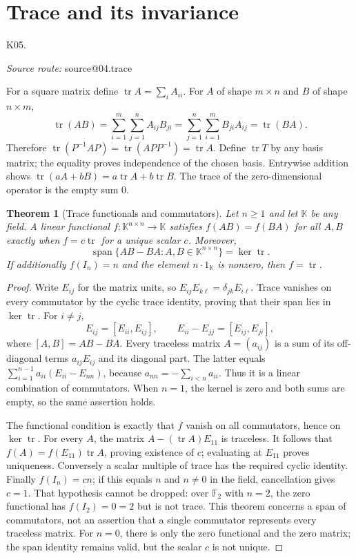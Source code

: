 \documentclass[11pt,a4paper]{book}
\makeatletter
\newtheorem{theorem}{Theorem}[chapter]
\theoremstyle{definition}\newtheorem{definition}[theorem]{Definition}
\theoremstyle{remark}\newtheorem{remark}[theorem]{Remark}
\newcommand{\K}{\mathbb K}\newcommand{\R}{\mathbb R}\newcommand{\C}{\mathbb C}
\DeclareMathOperator{\tr}{tr}\DeclareMathOperator{\Span}{span}
\newcommand{\Kentry}[2]{\section{#2}\label{k:#1}\noindent\textsf{\small K05.\detokenize{#1}}\par
  \begingroup\small\color{black!65}\textit{Source route: }\csname source@#1\endcsname\par\endgroup}
\makeatother
\begin{document}
\Kentry{04.trace}{Trace and its invariance}
For a square matrix define $\tr A=\sum_i A_{ii}$. For $A$ of shape $m\times n$ and $B$ of shape $n\times m$,
\[\tr(AB)=\sum_{i=1}^m\sum_{j=1}^n A_{ij}B_{ji}
 =\sum_{j=1}^n\sum_{i=1}^m B_{ji}A_{ij}=\tr(BA).\]
Therefore $\tr(P^{-1}AP)=\tr(APP^{-1})=\tr A$. Define $\tr T$ by any basis matrix; the equality proves independence of the chosen basis. Entrywise addition shows $\tr(aA+bB)=a\tr A+b\tr B$. The trace of the zero-dimensional operator is the empty sum $0$.

\begin{theorem}[Trace functionals and commutators]
Let $n\ge1$ and let $\K$ be any field. A linear functional $f:\K^{n\times n}\to\K$ satisfies $f(AB)=f(BA)$ for all $A,B$ exactly when $f=c\tr$ for a unique scalar $c$. Moreover,
\[
\Span\{AB-BA:A,B\in\K^{n\times n}\}=\ker\tr.
\]
If additionally $f(I_n)=n$ and the element $n\cdot1_\K$ is nonzero, then $f=\tr$.
\end{theorem}
\begin{proof}
Write $E_{ij}$ for the matrix units, so $E_{ij}E_{k\ell}=\delta_{jk}E_{i\ell}$. Trace vanishes on every commutator by the cyclic trace identity, proving that their span lies in $\ker\tr$. For $i\ne j$,
\[
E_{ij}=[E_{ii},E_{ij}],\qquad E_{ii}-E_{jj}=[E_{ij},E_{ji}],
\]
where $[A,B]=AB-BA$. Every traceless matrix $A=(a_{ij})$ is a sum of its off-diagonal terms $a_{ij}E_{ij}$ and its diagonal part. The latter equals
$\sum_{i=1}^{n-1}a_{ii}(E_{ii}-E_{nn})$, because $a_{nn}=-\sum_{i<n}a_{ii}$. Thus it is a linear combination of commutators. When $n=1$, the kernel is zero and both sums are empty, so the same assertion holds.

The functional condition is exactly that $f$ vanish on all commutators, hence on $\ker\tr$. For every $A$, the matrix $A-(\tr A)E_{11}$ is traceless. It follows that $f(A)=f(E_{11})\tr A$, proving existence of $c$; evaluating at $E_{11}$ proves uniqueness. Conversely a scalar multiple of trace has the required cyclic identity. Finally $f(I_n)=cn$; if this equals $n$ and $n\ne0$ in the field, cancellation gives $c=1$. That hypothesis cannot be dropped: over $\mathbb F_2$ with $n=2$, the zero functional has $f(I_2)=0=2$ but is not trace. This theorem concerns a span of commutators, not an assertion that a single commutator represents every traceless matrix. For $n=0$, there is only the zero functional and the zero matrix; the span identity remains valid, but the scalar $c$ is not unique.
\end{proof}
\end{document}
